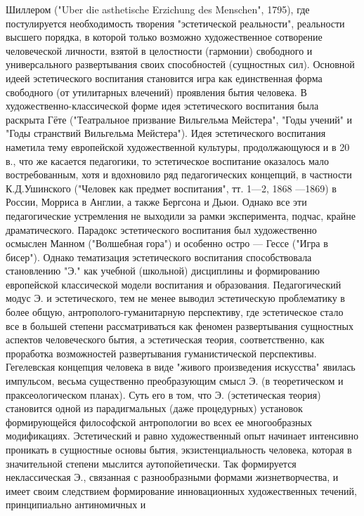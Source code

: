 \documentclass[12pt]{article}
\begin{document}
 Шиллером ("Uber die asthetische Erzichung des Menschen", 1795), где постулируется необходимость творения
"эстетической  реальности",  реальности  высшего  порядка,  в  которой  только  возможно  художественное
сотворение  человеческой  личности,  взятой  в  целостности  (гармонии)  свободного  и  универсального
развертывания своих способностей (сущностных сил). Основной идеей эстетического воспитания становится
игра  как  единственная  форма  свободного  (от  утилитарных  влечений)  проявления  бытия  человека.  В
художественно-классической  форме  идея  эстетического  воспитания  была  раскрыта  Гёте  ("Театральное
призвание  Вильгельма  Мейстера",  "Годы  учений"  и  "Годы  странствий  Вильгельма  Мейстера").  Идея
эстетического воспитания наметила тему европейской художественной культуры, продолжающуюся и в 20 в.,
что же касается педагогики, то эстетическое воспитание оказалось мало востребованным, хотя и вдохновило
ряд педагогических концепций, в частности К.Д.Ушинского ("Человек как предмет воспитания", тт. 1—2, 1868
—1869) в России, Морриса в Англии, а также Бергсона и Дьюи. Однако все эти педагогические устремления не
выходили за рамки эксперимента, подчас, крайне драматического. Парадокс эстетического воспитания был
художественно осмыслен Манном ("Волшебная гора") и особенно остро — Гессе ("Игра в бисер"). Однако
тематизация эстетического воспитания способствовала становлению "Э." как учебной (школьной) дисциплины
и формированию европейской классической модели воспитания и образования. Педагогический модус Э. и
эстетического, тем не менее выводил эстетическую проблематику в более общую, антрополого-гуманитарную
перспективу,  где  эстетическое  стало  все  в  большей  степени  рассматриваться  как  феномен  развертывания
сущностных  аспектов  человеческого  бытия,  а  эстетическая  теория,  соответственно,  как  проработка
возможностей развертывания гуманистической перспективы. Гегелевская концепция человека в виде "живого
произведения искусства" явилась импульсом, весьма существенно преобразующим смысл Э. (в теоретическом и
праксеологическом планах). Суть его в том, что Э. (эстетическая теория) становится одной из парадигмальных
(даже  процедурных)  установок  формирующейся  философской  антропологии  во  всех  ее  многообразных
модификациях. Эстетический и равно художественный опыт начинает интенсивно проникать в сущностные
основы бытия, экзистенциальность человека, которая в значительной степени мыслится аутопойетически. Так
формируется  неклассическая  Э.,  связанная  с  разнообразными  формами  жизнетворчества,  и  имеет  своим
следствием  формирование  инновационных  художественных  течений,  принципиально  антиномичных  и
\end{document}
